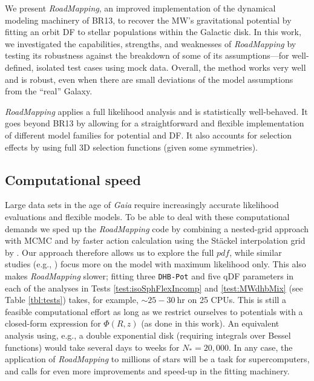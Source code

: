 \documentclass[iop,revtex4,numberedappendix,appendixfloats]{emulateapj}
\newcommand{\pdf}{\ensuremath{pdf}}
\newcommand{\RM}{{\sl RoadMapping}}
\begin{document}
We present \RM{}, an improved implementation of the dynamical modeling machinery of BR13, to recover the MW's gravitational potential by fitting an orbit DF to stellar populations within the Galactic disk. In this work, we investigated the capabilities, strengths, and weaknesses of \RM{} by testing its robustness against the breakdown of some of its assumptions---for well-defined, isolated test cases using mock data. Overall, the method works very well and is robust, even when there are small deviations of the model assumptions from the ``real'' Galaxy.

\RM{} applies a full likelihood analysis and is statistically well-behaved. It goes beyond BR13 by allowing for a straightforward and flexible implementation of different model families for potential and DF. It also accounts for selection effects by using full 3D selection functions (given some symmetries).\\

\subsection{Computational speed} 

Large data sets in the age of \emph{Gaia} require increasingly accurate likelihood evaluations and flexible models. To be able to deal with these computational demands we sped up the \RM{} code by combining a nested-grid approach with MCMC and by faster action calculation using the St\"{a}ckel \citep{2012MNRAS.426.1324B} interpolation grid by \citet{2015ApJS..216...29B}. Our approach therefore allows us to explore the full \pdf{}, while similar studies (e.g., \citealt{2014MNRAS.445.3133P,2015MNRAS.449.3479S,2016MNRAS.tmp..817D}) focus more on the model with maximum likelihood only. This also makes \RM{} slower; fitting three \texttt{DHB-Pot} and five qDF parameters in each of the analyses in Tests \ref{test:isoSphFlexIncomp} and \ref{test:MWdhbMix} (see Table \ref{tbl:tests}) takes, for example, $\sim 25-30~\text{hr}$ on 25 CPUs. This is still a feasible computational effort as long as we restrict ourselves to potentials with a closed-form expression for $\Phi(R,z)$ (as done in this work). An equivalent analysis using, e.g., a double exponential disk (requiring integrals over Bessel functions) would take several days to weeks for $N_*=20,000$. In any case, the application of \RM{} to millions of stars will be a task for supercomputers, and calls for even more improvements and speed-up in the fitting machinery.\\
\end{document}

